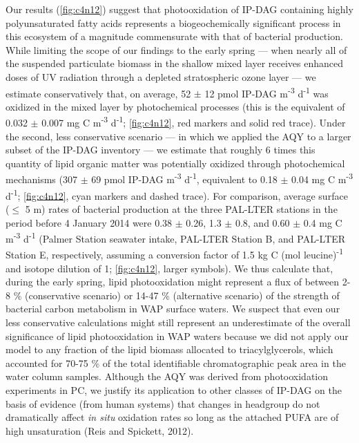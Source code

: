 Our results (\autoref{fig:c4n12}) suggest that photooxidation of IP-DAG containing highly polyunsaturated fatty acids represents a biogeochemically significant process in this ecosystem of a magnitude commensurate with that of bacterial production. While limiting the scope of our findings to the early spring --- when nearly all of the suspended particulate biomass in the shallow mixed layer receives enhanced doses of UV radiation through a depleted stratospheric ozone layer --- we estimate conservatively that, on average, 52 $\pm$ 12 pmol IP-DAG m\textsuperscript{-3} d\textsuperscript{-1} was oxidized in the mixed layer by photochemical processes (this is the equivalent of 0.032 $\pm$ 0.007 mg C m\textsuperscript{-3} d\textsuperscript{-1}; \autoref{fig:c4n12}, red markers and solid red trace). Under the second, less conservative scenario --- in which we applied the AQY to a larger subset of the IP-DAG inventory --- we estimate that roughly 6 times this quantity of lipid organic matter was potentially oxidized through photochemical mechanisms (307 $\pm$ 69 pmol IP-DAG m\textsuperscript{-3} d\textsuperscript{-1}, equivalent to 0.18 $\pm$ 0.04 mg C m\textsuperscript{-3} d\textsuperscript{-1}; \autoref{fig:c4n12}, cyan markers and dashed trace). For comparison, average surface ($\leq$ 5 m) rates of bacterial production at the three PAL-LTER stations in the period before 4 January 2014 were 0.38 $\pm$ 0.26, 1.3 $\pm$ 0.8, and 0.60 $\pm$ 0.4 mg C m\textsuperscript{-3} d\textsuperscript{-1} (Palmer Station seawater intake, PAL-LTER Station B, and PAL-LTER Station E, respectively, assuming a conversion factor of 1.5 kg C (mol leucine)\textsuperscript{-1} and isotope dilution of 1; \autoref{fig:c4n12}, larger symbols). We thus calculate that, during the early spring, lipid photooxidation might represent a flux of between 2-8 \% (conservative scenario) or 14-47 \% (alternative scenario) of the strength of bacterial carbon metabolism in WAP surface waters. We suspect that even our less conservative calculations might still represent an underestimate of the overall significance of lipid photooxidation in WAP waters because we did not apply our model to any fraction of the lipid biomass allocated to triacylglycerols, which accounted for 70-75 \% of the total identifiable chromatographic peak area in the water column samples. Although the AQY was derived from photooxidation experiments in PC, we justify its application to other classes of IP-DAG on the basis of evidence (from human systems) that changes in headgroup do not dramatically affect \emph{in situ} oxidation rates so long as the attached PUFA are of high unsaturation (Reis and Spickett, 2012).

